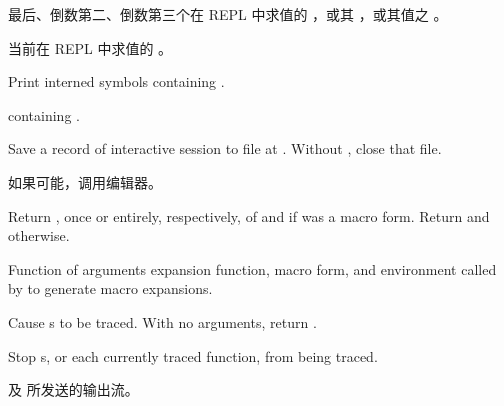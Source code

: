 \begin{LIST}{1cm}
  
  {
  最后、倒数第二、倒数第三个在 REPL
  中求值的 ，或其 ，或其值之
  。
  }

  \IT{\V*{--}}
  {
  当前在 REPL 中求值的 。
  }

  {
  Print interned symbols containing .
  }

  {
   containing .
  }

  {
  Save a record of interactive session to file at . Without
  , close that file.
  }

  {
  如果可能，调用编辑器。
  }

  {
  Return , once or entirely, respectively, of
   and \retvalii{\T} if  was a macro form. 
  Return  and \retvalii{\NIL} otherwise.
  }

  {
  Function of arguments expansion function, macro form, and
  environment called by  to generate macro
  expansions. 
  }

  {
  Cause s to be traced. With no arguments,
  return .
  }

  {
  Stop s, or each currently traced function, from being
  traced. 
  }

  {
     及  所发送的输出流。
  }


\end{LIST}
